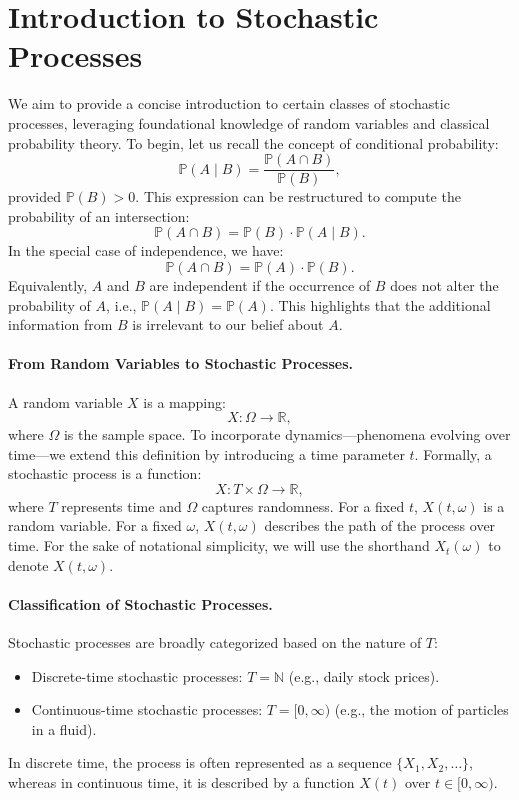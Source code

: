 \section{Introduction to Stochastic Processes}
We aim to provide a concise introduction to certain classes of stochastic processes, leveraging foundational knowledge of random variables and classical probability theory. To begin, let us recall the concept of conditional probability:
\[
\mathbb{P}(A \mid B) = \frac{\mathbb{P}(A \cap B)}{\mathbb{P}(B)},
\]
provided \( \mathbb{P}(B) > 0 \). This expression can be restructured to compute the probability of an intersection:
\[
\mathbb{P}(A \cap B) = \mathbb{P}(B) \cdot \mathbb{P}(A \mid B).
\]
In the special case of independence, we have:
\[
\mathbb{P}(A \cap B) = \mathbb{P}(A) \cdot \mathbb{P}(B).
\]
Equivalently, \( A \) and \( B \) are independent if the occurrence of \( B \) does not alter the probability of \( A \), i.e., \( \mathbb{P}(A \mid B) = \mathbb{P}(A) \). This highlights that the additional information from \( B \) is irrelevant to our belief about \( A \).

\paragraph{From Random Variables to Stochastic Processes.} 
A random variable \( X \) is a mapping:
\[
X: \Omega \to \mathbb{R},
\]
where \( \Omega \) is the sample space. To incorporate dynamics—phenomena evolving over time—we extend this definition by introducing a time parameter \( t \). Formally, a stochastic process is a function:
\[
X: T \times \Omega \to \mathbb{R},
\]
where \( T \) represents time and \( \Omega \) captures randomness. For a fixed \( t \), \( X(t, \omega) \) is a random variable. For a fixed \( \omega \), \( X(t, \omega) \) describes the path of the process over time. For the sake of notational simplicity, we will use the shorthand \( X_t(\omega) \) to denote \( X(t, \omega) \).


\paragraph{Classification of Stochastic Processes.}
Stochastic processes are broadly categorized based on the nature of \( T \):
\begin{itemize}
    \item Discrete-time stochastic processes: \( T = \mathbb{N} \) (e.g., daily stock prices).
    \item Continuous-time stochastic processes: \( T = [0, \infty) \) (e.g., the motion of particles in a fluid).
\end{itemize}
In discrete time, the process is often represented as a sequence \( \{X_1, X_2, \dots\} \), whereas in continuous time, it is described by a function \( X(t) \) over \( t \in [0, \infty) \).

